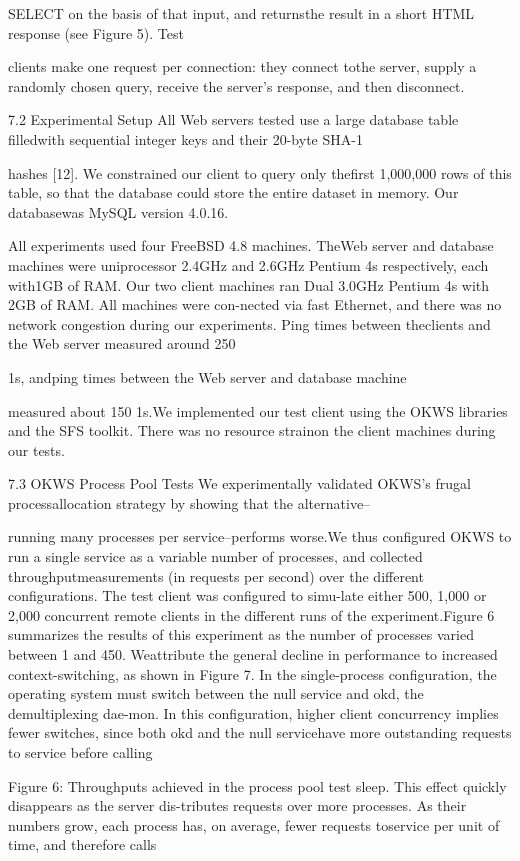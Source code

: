 SELECT on the basis of that input, and returnsthe result in a short HTML response (see Figure 5). Test

clients make one request per connection: they connect tothe server, supply a randomly chosen query, receive the
server's response, and then disconnect.

7.2 Experimental Setup
All Web servers tested use a large database table filledwith sequential integer keys and their 20-byte SHA-1

hashes [12]. We constrained our client to query only thefirst 1,000,000 rows of this table, so that the database
could store the entire dataset in memory. Our databasewas MySQL version 4.0.16.

All experiments used four FreeBSD 4.8 machines. TheWeb server and database machines were uniprocessor
2.4GHz and 2.6GHz Pentium 4s respectively, each with1GB of RAM. Our two client machines ran Dual 3.0GHz
Pentium 4s with 2GB of RAM. All machines were con-nected via fast Ethernet, and there was no network congestion during our experiments. Ping times between theclients and the Web server measured around 250

1s, andping times between the Web server and database machine

measured about 150 1s.We implemented our test client using the OKWS libraries and the SFS toolkit. There was no resource strainon the client machines during our tests.

7.3 OKWS Process Pool Tests
We experimentally validated OKWS's frugal processallocation strategy by showing that the alternative--

running many processes per service--performs worse.We thus configured OKWS to run a single service as a
variable number of processes, and collected throughputmeasurements (in requests per second) over the different
configurations. The test client was configured to simu-late either 500, 1,000 or 2,000 concurrent remote clients
in the different runs of the experiment.Figure 6 summarizes the results of this experiment as
the number of processes varied between 1 and 450. Weattribute the general decline in performance to increased
context-switching, as shown in Figure 7. In the single-process configuration, the operating system must switch
between the null service and okd, the demultiplexing dae-mon. In this configuration, higher client concurrency implies fewer switches, since both okd and the null servicehave more outstanding requests to service before calling

Figure 6: Throughputs achieved in the process pool test
sleep. This effect quickly disappears as the server dis-tributes requests over more processes. As their numbers
grow, each process has, on average, fewer requests toservice per unit of time, and therefore calls

